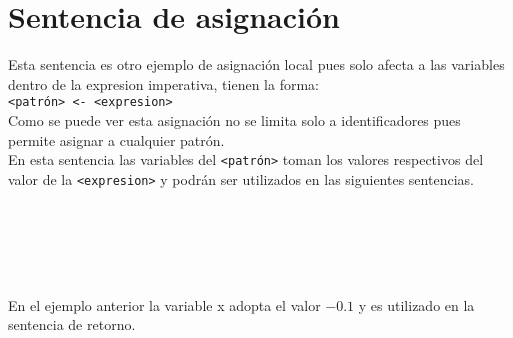    \section{Sentencia de asignación}
      Esta sentencia es otro ejemplo de asignación local pues solo afecta a las variables dentro de la expresion imperativa, tienen la forma:
      \\
      
      \texttt{<patrón>~<-~<expresion>}
      \\
      
      Como se puede ver esta asignación no se limita solo a identificadores pues permite asignar a cualquier patrón.
      \\
      
      En esta sentencia las variables del \texttt{<patrón>} toman los valores respectivos del valor de la \texttt{<expresion>} y podrán ser utilizados en las siguientes sentencias.
      
      \begin{fxcode}
         \\
          \\
         \\
         \\
      \end{fxcode}
      En el ejemplo anterior la variable x adopta el valor $-0.1$ y es utilizado en la sentencia de retorno.
      
      \begin{fxcode}
         \\
         \\
         \\
         \\
         \\
         \\
         \\
         \\
         \\
         \\
         \\
         \\
         \\
         \outcode{()} 
      \end{fxcode}
      

